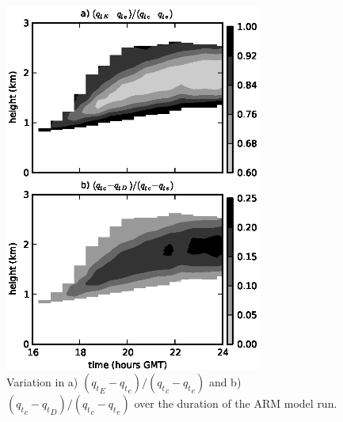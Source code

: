 \documentclass[draft,grl]{agutex}
\begin{document}
\begin{figure}
  \noindent\includegraphics[width=20pc]{./figures/shell_variability}
  \caption{Variation in a) $({q_t}_E - {q_t}_e)/({q_t}_c - {q_t}_e)$ and b)
  $({q_t}_c - {q_t}_D)/({q_t}_c - {q_t}_e)$ over the duration of the ARM model run.
  }
  \label{fig:shell_variability}
\end{figure}

%
%
%
%
%
%

\end{document}
